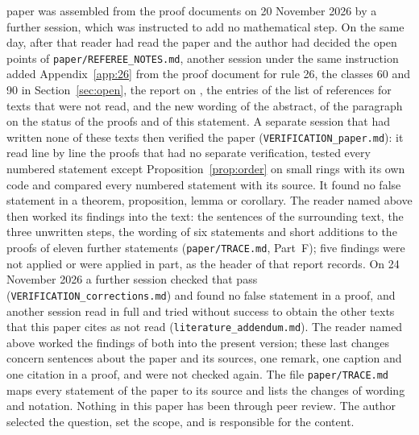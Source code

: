 \documentclass[10pt,a4paper]{article}
\begin{document}
\begin{sloppypar}
paper was assembled from the proof documents on 20 November 2026 by a further session, which was instructed to add
no mathematical step. On the same day, after that reader had read the paper and the author had decided the open
points of \texttt{paper/REFEREE\_NOTES.md}, another session under the same instruction added
Appendix~\ref{app:26} from the proof document for rule 26, the classes 60 and 90 in Section~\ref{sec:open}, the
report on \cite{ZhuRichard2026}, the entries of the list of references for texts that were not read, and the new
wording of the abstract, of the paragraph on the status of the proofs and of this statement. A separate session
that had written none of these texts then verified the paper (\texttt{VERIFICATION\_paper.md}): it read line by
line the proofs that had no separate verification, tested every numbered statement except
Proposition~\ref{prop:order} on small rings with its own code and
compared every numbered statement with its source. It found no false statement in a theorem, proposition, lemma or
corollary. The reader named above then worked its findings into the text: the sentences of the surrounding text,
the three unwritten steps, the wording of six statements and short additions to the proofs of eleven further
statements (\texttt{paper/TRACE.md}, Part~F); five findings were not applied or were applied in part, as the header
of that report records. On 24 November 2026 a further session checked that pass
(\texttt{VERIFICATION\_corrections.md}) and found no false statement in a proof, and another session read
\cite{Young1993} in full and tried without success to obtain the other texts that this paper cites as not read
(\texttt{literature\_addendum.md}). The reader named above worked the findings of both into the present version;
these last changes concern sentences about the paper and its sources, one remark, one caption and one citation in a
proof, and were not checked again. The file
\texttt{paper/TRACE.md} maps every statement of the paper to its source and lists the changes of wording and
notation. Nothing in this paper has been through peer review. The author selected the question, set the scope, and
is responsible for the content.


\end{sloppypar}
\end{document}
